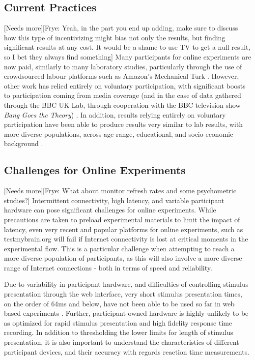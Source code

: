 \documentclass[12pt,a4paper,titlepage]{scrreprt}
\begin{document}
\subsection{Current Practices}
[Needs more][Frye: Yeah, in the part you end up adding, make sure to discuss how this type of incentivizing might bias not only the results, but finding significant results at any cost. It would be a shame to use TV to get a null result, so I bet they always find something]
Many participants for online experiments are now paid, similarly to many laboratory studies, particularly through the use of crowdsourced labour platforms such as Amazon's Mechanical Turk \parencite{buhrmester_amazons_2011,rand_promise_2012,crump_evaluating_2013}. However, other work has relied entirely on voluntary participation, with significant boosts to participation coming from media coverage (and in the case of data gathered through the BBC UK Lab, through cooperation with the BBC television show \textit{Bang Goes the Theory}) \parencite{owen_putting_2010}. In addition, results relying entirely on voluntary participation have been able to produce results very similar to lab results, with more diverse populations, across age range, educational, and socio-economic background \parencite{germine_is_2012,halberda_number_2012}.
\subsection{Challenges for Online Experiments}
[Needs more][Frye: What about monitor refresh rates and some psychometric studies?]
Intermittent connectivity, high latency, and variable participant hardware can pose significant challenges for online experiments. While precautions are taken to preload experimental materials to limit the impact of latency, even very recent and popular platforms for online experiments, such as testmybrain.org \parencite{germine_is_2012, halberda_number_2012} will fail if Internet connectivity is lost at critical moments in the experimental flow. This is a particular challenge when attempting to reach a more diverse population of participants, as this will also involve a more diverse range of Internet connections - both in terms of speed and reliability.

Due to variability in participant hardware, and difficulties of controlling stimulus presentation through the web interface, very short stimulus presentation times, on the order of 64ms and below, have not been able to be used so far in web based experiments \parencite{crump_evaluating_2013}. Further, participant owned hardware is highly unlikely to be as optimized for rapid stimulus presentation and high fidelity response time recording. In addition to thresholding the lower limits for length of stimulus presentation, it is also important to understand the characteristics of different participant devices, and their accuracy with regards reaction time measurements.
\end{document}
